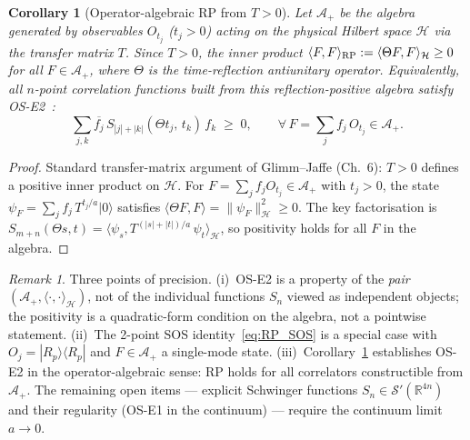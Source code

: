 \documentclass[12pt]{article}
\newtheorem{corollary}[theorem]{Corollary}
\theoremstyle{definition}
\theoremstyle{remark}
\newtheorem{remark}[theorem]{Remark}
\begin{document}
\begin{corollary}[Operator-algebraic RP from $T > 0$]
\label{cor:rp_npoint}
Let $\mathcal{A}_+$ be the algebra generated by observables
$O_{t_j}$ ($t_j > 0$) acting on the physical Hilbert space $\mathcal{H}$
via the transfer matrix $T$.
Since $T > 0$, the inner product
$\langle F, F \rangle_{\rm RP} := \langle \Theta F, F \rangle_\mathcal{H} \geq 0$
for all $F \in \mathcal{A}_+$, where $\Theta$ is the time-reflection
antiunitary operator.
Equivalently, all $n$-point correlation functions built from this
reflection-positive algebra satisfy OS-E2~\cite{GlimmJaffe1987}:
\[
\sum_{j,k} \overline{f_j}\,S_{|j|+|k|}(\Theta t_j,\, t_k)\,f_k \;\geq\; 0,
\qquad \forall\, F = \sum_j f_j\, O_{t_j} \in \mathcal{A}_+.
\]
\end{corollary}

\begin{proof}
Standard transfer-matrix argument of Glimm--Jaffe \cite{GlimmJaffe1987} (Ch.~6):
$T > 0$ defines a positive inner product on $\mathcal{H}$.
For $F = \sum_j f_j O_{t_j} \in \mathcal{A}_+$ with $t_j > 0$, the state
$\psi_F = \sum_j f_j\, T^{t_j/a} |0\rangle$ satisfies
$\langle \Theta F, F\rangle = \|\psi_F\|_\mathcal{H}^2 \geq 0$.
The key factorisation is $S_{m+n}(\Theta s, t) =
\langle \psi_s, T^{(|s|+|t|)/a}\,\psi_t\rangle_\mathcal{H}$,
so positivity holds for all $F$ in the algebra.
\end{proof}

\begin{remark}
Three points of precision.
(i)~OS-E2 is a property of the \emph{pair} $(\mathcal{A}_+, \langle\cdot,\cdot\rangle_\mathcal{H})$,
not of the individual functions $S_n$ viewed as independent objects;
the positivity is a quadratic-form condition on the algebra, not a pointwise statement.
(ii)~The 2-point SOS identity~\eqref{eq:RP_SOS} is a special case with
$O_j = |R_p\rangle\langle R_p|$ and $F \in \mathcal{A}_+$ a single-mode state.
(iii)~Corollary~\ref{cor:rp_npoint} establishes OS-E2 in the operator-algebraic sense:
RP holds for all correlators constructible from $\mathcal{A}_+$.
The remaining open items --- explicit Schwinger functions $S_n \in \mathcal{S}'(\mathbb{R}^{4n})$
and their regularity (OS-E1 in the continuum) --- require the continuum limit $a\to 0$.
\end{remark}
\end{document}
